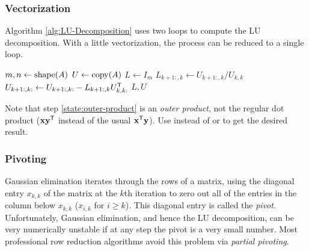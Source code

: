 \subsubsection*{Vectorization} %

Algorithm \ref{alg:LU-Decomposition} uses two loops to compute the LU decomposition.
With a little vectorization, the process can be reduced to a single loop.

\begin{algorithm}[H]
\begin{algorithmic}[1]
    \State $m, n \gets \mathrm{shape}(A)$
    \State $U \gets \mathrm{copy}(A)$
    \State $L \gets I_m$
        \State $L_{k+1:,k} \gets U_{k+1:,k}/U_{k,k}$
        \State $U_{k+1:,k:} \gets U_{k+1:,k:} - L_{k+1:,k}U_{k,k:}^{\mathsf T}$
        \label{state:outer-product}
    \EndFor
    \State {} $L, U$
\EndProcedure
\end{algorithmic}
\caption{}
\end{algorithm}

Note that step \ref{state:outer-product} is an \emph{outer product}, not the regular dot product ($\mathbf{x}\mathbf{y}^{\mathsf T}$ instead of the usual $\mathbf{x}^{\mathsf T}\mathbf{y}$).
Use  instead of  or  to get the desired result.

\subsubsection*{Pivoting} %

Gaussian elimination iterates through the rows of a matrix, using the diagonal entry $x_{k,k}$ of the matrix at the $k$th iteration to zero out all of the entries in the column below $x_{k,k}$ ($x_{i,k}$ for $i\ge k$).
This diagonal entry is called the \emph{pivot}.
Unfortunately, Gaussian elimination, and hence the LU decomposition, can be very numerically unstable if at any step the pivot is a very small number.
Most professional row reduction algorithms avoid this problem via \emph{partial pivoting}.

